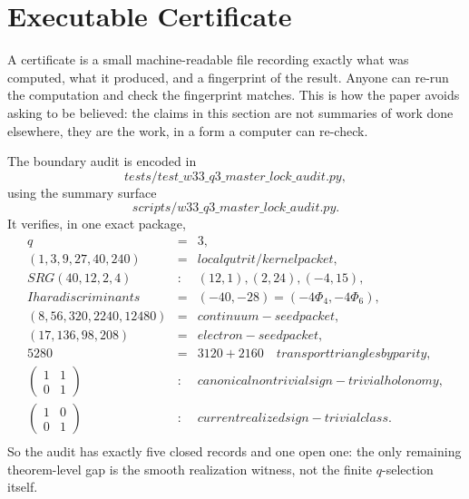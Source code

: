 \documentclass[12pt,a4paper]{article}
\def\mathrm#1{#1}%
\def\texttt#1{#1}%
\def\text#1{#1}%
\def\Phi#1{Phi#1}%
\theoremstyle{definition}
\newcommand{\SRG}{\mathrm{SRG}}
\begin{document}
\section*{Executable Certificate}

\begin{plainbox}
A certificate is a small machine-readable file recording exactly what was computed,
what it produced, and a fingerprint of the result. Anyone can re-run the computation and
check the fingerprint matches. This is how the paper avoids asking to be believed: the
claims in this section are not summaries of work done elsewhere, they are the work, in a
form a computer can re-check.
\end{plainbox}


The boundary audit is encoded in
\[
\texttt{tests/test\_w33\_q3\_master\_lock\_audit.py},
\]
using the summary surface
\[
\texttt{scripts/w33\_q3\_master\_lock\_audit.py}.
\]
It verifies, in one exact package,
\[
\begin{array}{rcl}
q &=& 3,\\
(1,3,9,27,40,240) &=& \text{local qutrit/kernel packet},\\
\SRG(40,12,2,4) &:& (12,1),(2,24),(-4,15),\\
\text{Ihara discriminants} &=& (-40,-28)=(-4\Phi_4,-4\Phi_6),\\
(8,56,320,2240,12480) &=& \text{continuum-seed packet},\\
(17,136,98,208) &=& \text{electron-seed packet},\\
5280 &=& 3120 + 2160 \quad \text{transport triangles by parity},\\
\begin{pmatrix}1&1\\0&1\end{pmatrix} &:& \text{canonical nontrivial sign-trivial holonomy},\\
\begin{pmatrix}1&0\\0&1\end{pmatrix} &:& \text{current realized sign-trivial class}.\\
\end{array}
\]
So the audit has exactly five closed records and one open one: the only
remaining theorem-level gap is the smooth realization witness, not the
finite $q$-selection itself.
\end{document}
